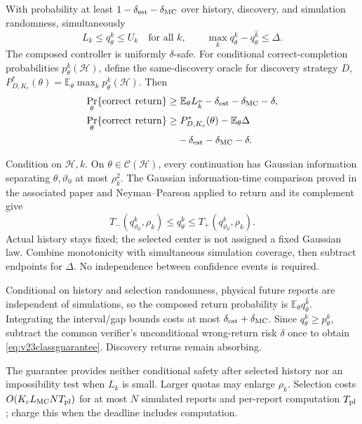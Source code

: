 \begin{theorem}
\label{thm:v23selector}
With probability at least $1-\delta_{\rm est}-\delta_{\rm MC}$ over
history, discovery, and simulation randomness, simultaneously
$$
 L_k\leq q_\theta^k\leq U_k\quad\text{for all }k,\qquad
 \max_k q_\theta^k-q_\theta^{\widehat k}\leq\Delta.
$$
The composed controller is uniformly $\delta$-safe. For conditional
correct-completion probabilities $p_\theta^k(\mathcal H)$, define the
same-discovery oracle for discovery strategy $D$,
$P^*_{D,K_c}(\theta)=\mathbb E_\theta\max_k p_\theta^k(\mathcal H)$.
Then
\begin{equation}
 \begin{split}
 \Pr_\theta\{\mathrm{correct\ return}\}
 &\geq\mathbb E_\theta L_{\widehat k}-\delta_{\rm est}-\delta_{\rm MC}-\delta,\\
 \Pr_\theta\{\mathrm{correct\ return}\}
 &\geq P^*_{D,K_c}(\theta)-\mathbb E_\theta\Delta\\
 &\quad-\delta_{\rm est}-\delta_{\rm MC}-\delta.
 \end{split}
 \label{eq:v23classguarantee}
\end{equation}
\end{theorem}

\begin{IEEEproof}
Condition on $\mathcal H,k$. On $\theta\in\mathcal C(\mathcal H)$, every continuation has Gaussian information separating $\theta,\vartheta_0$ at most $\rho_k^2$. The Gaussian information-time comparison proved in the associated paper and Neyman--Pearson applied to return and its complement give
$$T_-(q_{\vartheta_0}^k,\rho_k)\leq q_\theta^k
\leq T_+(q_{\vartheta_0}^k,\rho_k).$$
Actual history stays fixed; the selected center is not assigned a fixed Gaussian law. Combine monotonicity with simultaneous simulation coverage, then subtract endpoints for $\Delta$. No independence between confidence events is required.

Conditional on history and selection randomness, physical future reports are independent of simulations, so the composed return probability is $\mathbb E_\theta q_\theta^{\widehat k}$. Integrating the interval/gap bounds costs at most $\delta_{\rm est}+\delta_{\rm MC}$. Since $q_\theta^k\geq p_\theta^k$, subtract the common verifier's unconditional wrong-return risk $\delta$ once to obtain \eqref{eq:v23classguarantee}. Discovery returns remain absorbing.
\end{IEEEproof}

The guarantee provides neither conditional safety after selected history nor an impossibility test when $L_k$ is small. Larger quotas may enlarge $\rho_k$. Selection costs $O(K_cL_{\rm MC}NT_{\rm pl})$ for at most $N$ simulated reports and per-report computation $T_{\rm pl}$; charge this when the deadline includes computation.


